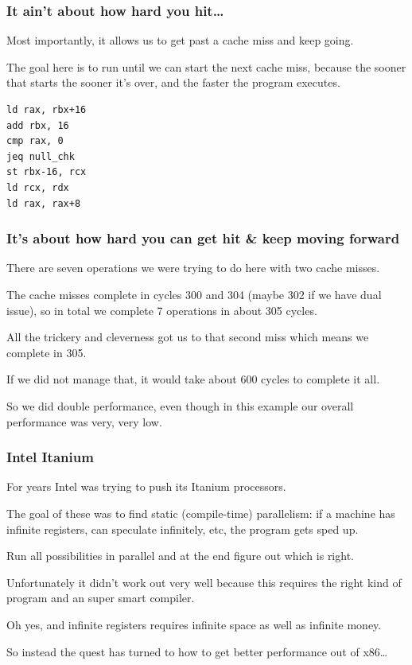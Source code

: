 \begin{frame}[fragile]
\frametitle{It ain't about how hard you hit\ldots}

Most importantly, it allows us to get past a cache miss and keep going.

The goal here is to run until we can start the next cache miss, because the sooner that starts the sooner it's over, and the faster the program executes.


\begin{verbatim}
ld rax, rbx+16
add rbx, 16
cmp rax, 0
jeq null_chk
st rbx-16, rcx
ld rcx, rdx
ld rax, rax+8
\end{verbatim}


\end{frame}



\begin{frame}
\frametitle{It's about how hard you can get hit \& keep moving forward}

There are seven operations we were trying to do here with two cache misses. 

The cache misses complete in cycles 300 and 304 (maybe 302 if we have dual issue), so in total we complete 7 operations in about 305 cycles. 

All the trickery and cleverness got us to that second miss which means we complete in 305. 

If we did not manage that, it would take about 600 cycles to complete it all. 

So we did double performance, even though in this example our overall performance was very, very low.

\end{frame}



\begin{frame}
\frametitle{Intel Itanium}

For years Intel was trying to push its Itanium processors. 

The goal of these was to find static (compile-time) parallelism: if a machine has infinite registers, can speculate infinitely, etc, the program gets sped up. 

Run all possibilities in parallel and at the end figure out which is right.

Unfortunately it didn't work out very well because this requires the right kind of program and an super smart compiler. 

Oh yes, and infinite registers requires infinite space as well as infinite money. 

So instead the quest has turned to how to get better performance out of x86\ldots

\end{frame}



